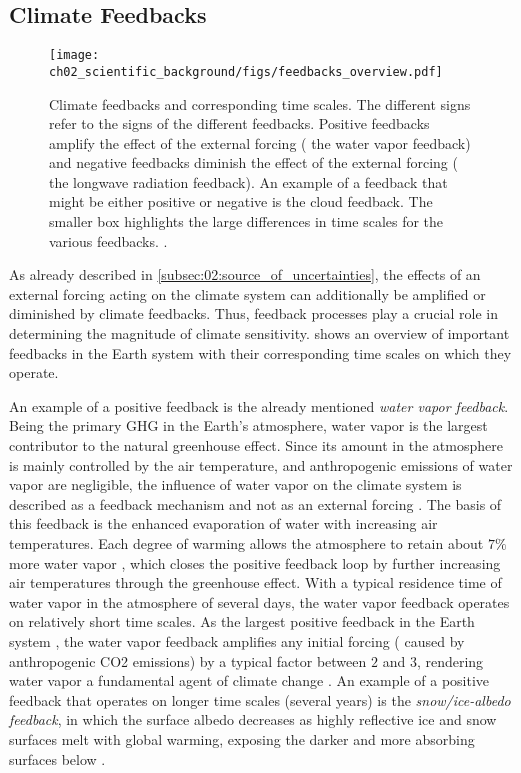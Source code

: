 \subsection{Climate Feedbacks}
\label{subsec:02:climate_feedbacks}

\begin{figure}[!t]
  \centering
  \texttt{[image: 
    ch02\_scientific\_background/figs/feedbacks\_overview.pdf]}
  \caption[
    Climate feedbacks and corresponding time scales.
  ]{
    Climate feedbacks and corresponding time scales. The different signs refer
    to the signs of the different feedbacks. Positive feedbacks amplify the
    effect of the external forcing (\eg{} the water vapor feedback) and
    negative feedbacks diminish the effect of the external forcing (\eg{} the
    longwave radiation feedback). An example of a feedback that might be either
    positive or negative is the cloud feedback. The smaller box highlights the
    large differences in time scales for the various feedbacks.
    .
  }
  \label{fig:02:feedbacks_overview}
\end{figure}

As already described in \cref{subsec:02:source_of_uncertainties}, the effects
of an external forcing acting on the climate system can additionally be
amplified or diminished by climate feedbacks. Thus, feedback processes play a
crucial role in determining the magnitude of climate sensitivity.
 shows an overview of important feedbacks in
the Earth system with their corresponding time scales on which they operate.

An example of a positive feedback is the already mentioned \emph{water vapor
  feedback}. Being the primary \ac{GHG} in the Earth's atmosphere, water vapor
is the largest contributor to the natural greenhouse effect. Since its amount
in the atmosphere is mainly controlled by the air temperature, and
anthropogenic emissions of water vapor are negligible, the influence of water
vapor on the climate system is described as a feedback mechanism and not as an
external forcing \autocite{Myhre2013}. The basis of this feedback is the
enhanced evaporation of water with increasing air temperatures. Each degree of
warming allows the atmosphere to retain about $7 \unit{\%}$ more water vapor
\autocite{Myhre2013}, which closes the positive feedback loop by further
increasing air temperatures through the greenhouse effect. With a typical
residence time of water vapor in the atmosphere of several days, the water
vapor feedback operates on relatively short time scales. As the largest
positive feedback in the Earth system \autocite{Soden2006}, the water vapor
feedback amplifies any initial forcing (\eg{} caused by anthropogenic \ac{CO2}
emissions) by a typical factor between $2$ and $3$, rendering water vapor a
fundamental agent of climate change \autocite{Myhre2013}. An example of a
positive feedback that operates on longer time scales (several years) is the
\emph{snow/ice-albedo feedback}, in which the surface albedo decreases as
highly reflective ice and snow surfaces melt with global warming, exposing the
darker and more absorbing surfaces below \autocite{Cubasch2013}.

